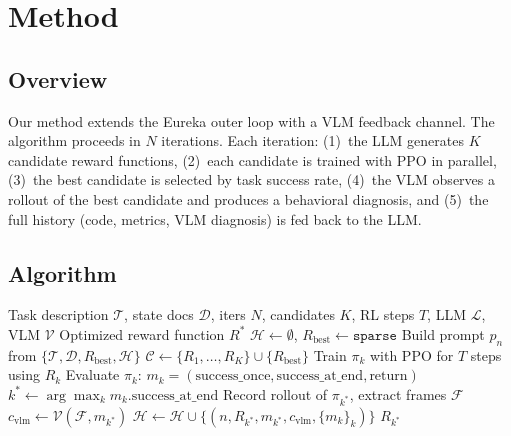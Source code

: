 \documentclass[conference]{IEEEtran}
\begin{document}
\section{Method}\label{sec:method}

\subsection{Overview}

Our method extends the Eureka outer loop with a VLM feedback channel. The
algorithm proceeds in $N$ iterations. Each iteration: (1)~the LLM generates $K$
candidate reward functions, (2)~each candidate is trained with PPO in parallel,
(3)~the best candidate is selected by task success rate, (4)~the VLM observes
a rollout of the best candidate and produces a behavioral diagnosis, and (5)~the
full history (code, metrics, VLM diagnosis) is fed back to the LLM.

\subsection{Algorithm}

\begin{algorithm}[t]
\caption{VLM-in-the-Loop Reward Generation}
\label{alg:vlm_loop}
\begin{algorithmic}[1]
\REQUIRE Task description $\mathcal{T}$, state docs $\mathcal{D}$, iters $N$, candidates $K$, RL steps $T$, LLM $\mathcal{L}$, VLM $\mathcal{V}$
\ENSURE Optimized reward function $R^*$
\STATE $\mathcal{H} \leftarrow \emptyset$, $R_{\text{best}} \leftarrow \texttt{sparse}$
    \STATE Build prompt $p_n$ from $\{\mathcal{T}, \mathcal{D}, R_{\text{best}}, \mathcal{H}\}$
    \STATE $\mathcal{C} \leftarrow \{R_1, \ldots, R_K\} \cup \{R_{\text{best}}\}$
        \STATE Train $\pi_k$ with PPO for $T$ steps using $R_k$
        \STATE Evaluate $\pi_k$: $m_k = (\text{success\_once}, \text{success\_at\_end}, \text{return})$
    \ENDFOR
    \STATE $k^* \leftarrow \arg\max_k m_k.\text{success\_at\_end}$
    \STATE Record rollout of $\pi_{k^*}$, extract frames $\mathcal{F}$
    \STATE $c_{\text{vlm}} \leftarrow \mathcal{V}(\mathcal{F}, m_{k^*})$
    \STATE $\mathcal{H} \leftarrow \mathcal{H} \cup \{(n, R_{k^*}, m_{k^*}, c_{\text{vlm}}, \{m_k\}_k)\}$
\ENDFOR
\RETURN $R_{k^*}$
\end{algorithmic}
\end{algorithm}
\end{document}
